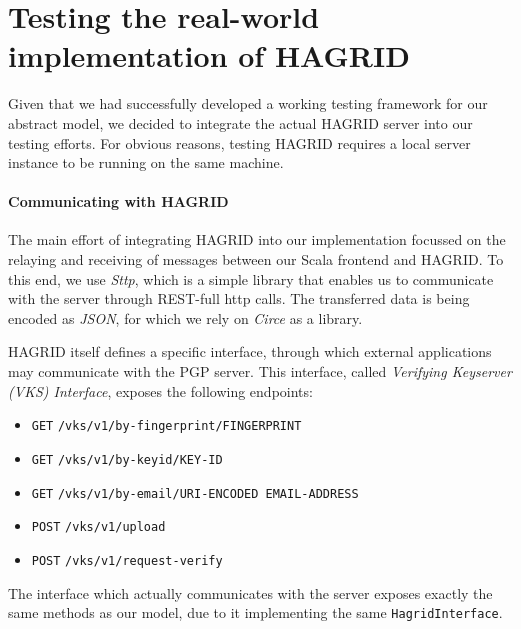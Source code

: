 \section{Testing the real-world implementation of HAGRID}
Given that we had successfully developed a working testing framework for our abstract model, we decided to integrate the actual HAGRID server into our testing efforts.
For obvious reasons, testing HAGRID requires a local server instance to be running on the same machine. 

\paragraph{Communicating with HAGRID}
The main effort of integrating HAGRID into our implementation focussed on the relaying and receiving of messages between our Scala frontend and HAGRID.
To this end, we use \emph{Sttp}, which is a simple library that enables us to communicate with the server through REST-full http calls. The transferred data is being encoded as \emph{JSON}, for which we rely on \emph{Circe} as a library.

HAGRID itself defines a specific interface, through which external applications may communicate with the PGP server. This interface, called \emph{Verifying Keyserver (VKS) Interface}, exposes the following endpoints: 
\begin{itemize}
    \item \texttt{GET}  \texttt{/vks/v1/by-fingerprint/FINGERPRINT}
    \item \texttt{GET}  \texttt{/vks/v1/by-keyid/KEY-ID}
    \item \texttt{GET}  \texttt{/vks/v1/by-email/URI-ENCODED EMAIL-ADDRESS}
    \item \texttt{POST} \texttt{/vks/v1/upload}
    \item \texttt{POST} \texttt{/vks/v1/request-verify}
\end{itemize}

The interface which actually communicates with the server exposes exactly the same methods as our model, due to it implementing the same 
\texttt{HagridInterface}.

